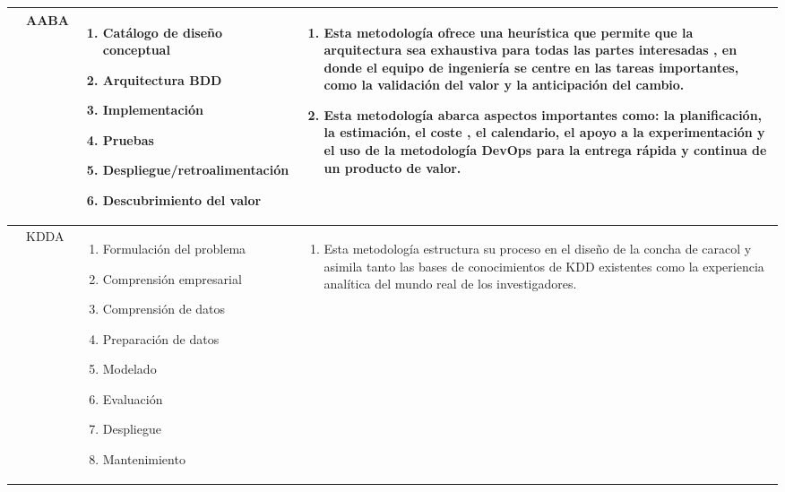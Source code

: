 \begin{table*}[!htb]
	\footnotesize
	\begin{threeparttable}	
		\begin{tabular}{p{1cm} p{2cm} p{5cm} p{6.5cm}} \toprule
			\cite{Chen2016}
			& AABA
			&  \begin{enumerate}
				\item Catálogo de diseño conceptual
				\item Arquitectura BDD 
				\item Implementación
				\item Pruebas
				\item Despliegue/retroalimentación 
				\item Descubrimiento del valor
			\end{enumerate}
			& \begin{enumerate}
				\item Esta metodología ofrece una heurística que permite que la arquitectura sea exhaustiva para todas las partes interesadas , en donde el equipo de ingeniería se centre en las tareas importantes, como la validación del valor y la anticipación del cambio.
				\item Esta metodología abarca aspectos importantes como: la planificación, la estimación, el coste , el calendario, el apoyo a la experimentación y el uso de la metodología DevOps para la entrega rápida y continua de un producto de valor.
			\end{enumerate}
			\\ \hline
			\cite{Li2016}
			& KDDA
			&  \begin{enumerate}
				\item Formulación del problema
				\item Comprensión empresarial
				\item Comprensión de datos
				\item Preparación de datos
				\item Modelado
				\item Evaluación
				\item Despliegue 
				\item Mantenimiento
			\end{enumerate}
			& \begin{enumerate}
				\item Esta metodología estructura su proceso en el diseño de la concha de caracol y asimila tanto las bases de conocimientos de KDD existentes como la experiencia analítica del mundo real de los investigadores. 

\end{enumerate}
\end{tabular}
\end{threeparttable}
\end{table*}
